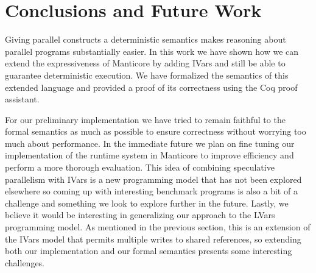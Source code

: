 \section{Conclusions and Future Work}
Giving parallel constructs a deterministic semantics makes reasoning about parallel programs substantially easier.  In this work we have shown how we can extend the expressiveness of Manticore by adding IVars and still be able to guarantee deterministic execution.  We have formalized the semantics of this extended language and provided a proof of its correctness using the Coq proof assistant.  

For our preliminary implementation we have tried to remain faithful to the formal semantics as much as possible to ensure correctness without worrying too much about performance.  In the immediate future we plan on fine tuning our implementation of the runtime system in Manticore to improve efficiency and perform a more thorough evaluation.  This idea of combining speculative parallelism with IVars is a new programming model that has not been explored elsewhere so coming up with interesting benchmark programs is also a bit of a challenge and something we look to explore further in the future.  Lastly, we believe it would be interesting in generalizing our approach to the LVars programming model.  As mentioned in the previous section, this is an extension of the IVars model that permits multiple writes to shared references, so extending both our implementation and our formal semantics presents some interesting challenges.  





